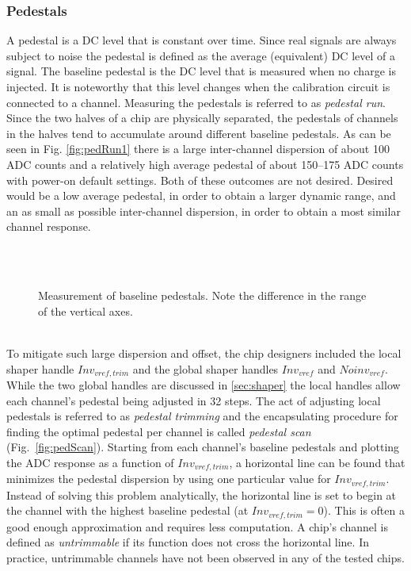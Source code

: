 \documentclass[../../main.tex]{subfiles}
\begin{document}
\subsubsection{Pedestals}\label{sec:ped}
A pedestal is a DC level that is constant over time. Since real signals are always subject to noise the pedestal is defined as the average (equivalent) DC level of a signal. The baseline pedestal is the DC level that is measured when no charge is injected. It is noteworthy that this level changes when the calibration circuit is connected to a channel. Measuring the pedestals is referred to as \textit{pedestal run}. Since the two halves of a chip are physically separated, the pedestals of channels in the halves tend to accumulate around different baseline pedestals. As can be seen in Fig. \ref{fig:pedRun1} there is a large inter-channel dispersion of about 100 ADC counts and a relatively high average pedestal of about 150--175 ADC counts with power-on default settings. Both of these outcomes are not desired. Desired would be a low average pedestal, in order to obtain a larger dynamic range, and an as small as possible inter-channel dispersion, in order to obtain a most similar channel response.\\
\begin{figure}[htp]
\centering
	\\
	\\
	\caption{Measurement of baseline pedestals. Note the difference in the range of the vertical axes.}
\end{figure}
\\
To mitigate such large dispersion and offset, the chip designers included the local shaper handle $Inv_{vref,trim}$ and the global shaper handles $Inv_{vref}$ and $Noinv_{vref}$. While the two global handles are discussed in \ref{sec:shaper} the local handles allow each channel’s pedestal being adjusted in 32 steps. The act of adjusting local pedestals is referred to as \textit{pedestal trimming} and the encapsulating procedure for finding the optimal pedestal per channel is called \textit{pedestal scan} (Fig.~\ref{fig:pedScan}). Starting from each channel’s baseline pedestals and plotting the ADC response as a function of $Inv_{vref,trim}$, a horizontal line can be found that minimizes the pedestal dispersion by using one particular value for $Inv_{vref,trim}$. Instead of solving this problem analytically, the horizontal line is set to begin at the channel with the highest baseline pedestal (at $Inv_{vref,trim}=0$). This is often a good enough approximation and requires less computation. A chip’s channel is defined as \textit{untrimmable} if its function does not cross the horizontal line. In practice, untrimmable channels have not been observed in any of the tested chips.\\
\end{document}
